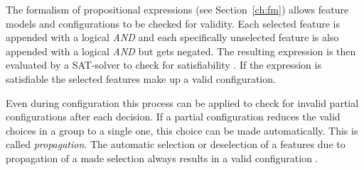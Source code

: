 The formalism of propositional expressions (see Section~\ref{ch:fm}) allows feature models and configurations to be checked for validity. Each selected feature is appended with a logical \textit{AND} and each specifically unselected feature is also appended with a logical \textit{AND} but gets negated. The resulting expression is then evaluated by a SAT-solver to check for satisfiability \cite{sat-solve}. If the expression is satisfiable the selected features make up a valid configuration.

Even during configuration this process can be applied to check for invalid partial configurations after each decision. If a partial configuration reduces the valid choices in a group to a single one, this choice can be made automatically. This is called \textit{propagation}. The automatic selection or deselection of a features due to propagation of a made selection always results in a valid configuration \cite{fmi}.